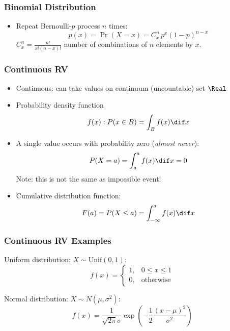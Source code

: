 \documentclass[mathserif, xcolor=table, svgnames]{beamer}
\begin{document}
\begin{frame}
  \frametitle{Binomial Distribution}
  \begin{itemize}
  \item Repeat Bernoulli-$p$ process $n$ times:
    \begin{equation*}
      p(x) = \Pr(X = x) = C_{x}^{n} \, p^{x} (1 - p)^{n - x}
    \end{equation*}
    $C_{x}^{n} = \frac{n!}{x!(n - x)!}$ number of combinations of $n$
    elements by $x$.
  \end{itemize}
\end{frame}


\begin{frame}
  \frametitle{Continuous RV}
  \begin{itemize}
  \item Continuous: can take values on continuum (uncountable) set
    $\Real$
  \item Probability density function
    \begin{equation*}
      f(x) : P(x \in B) = \int_{B} f(x) \dif x
    \end{equation*}
  \item A single value occurs with probability zero (\emph{almost
      never}):
    \begin{equation*}
      P(X = a) = \int_{a}^{a} f(x) \dif x = 0
    \end{equation*}
    Note: this is not the same as impossible event!
  \item Cumulative distribution function:
    \begin{equation*}
      F(a) = P(X \le a) = \int_{-\infty}^{a} f(x) \dif x
    \end{equation*}
  \end{itemize}
\end{frame}

\begin{frame}
  \frametitle{Continuous RV Examples}
  \begin{description}
  \item Uniform distribution: $X \sim \text{Unif}(0,1)$:
    \begin{equation*}
      f(x) =
      \begin{cases}
        1, & 0 \le x \le 1\\
        0, & \text{otherwise}
      \end{cases}
    \end{equation*}
  \item Normal distribution: $X \sim N(\mu,\sigma^{2})$:
    \begin{equation*}
      f(x) = \frac{1}{\sqrt{2\pi} \sigma}
      \exp\left(
        -\frac{1}{2} \frac{(x - \mu)^{2}}{\sigma^{2}}
        \right)
    \end{equation*}
  \end{description}
\end{frame}
\end{document}
